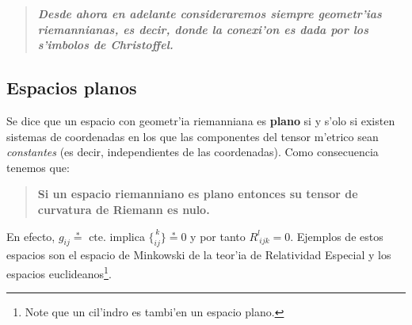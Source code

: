 
\begin{quotation}
\textbf{\textit{Desde ahora en adelante consideraremos siempre geometr'ias riemannianas, es
decir, donde la conexi'on es dada por los s'imbolos de Christoffel.}}
\end{quotation}

\subsection{Espacios planos}
Se dice que un espacio con geometr'ia riemanniana es \textbf{plano} si y s'olo si existen sistemas de coordenadas en los que las componentes del tensor m'etrico sean \textit{constantes} (es decir, independientes de las coordenadas). Como consecuencia tenemos que:
\begin{quotation}
\textbf{Si un espacio riemanniano es plano entonces su tensor de curvatura de Riemann es nulo.}
\end{quotation}
En efecto, $g_{ij}\overset{\ast}{=}$ cte. implica $\{ _{ i j}^{\, k}\}
\overset{\ast}{=}0$ y por tanto $R_{\ i j k}^l=0$. Ejemplos de estos
espacios son el espacio de Minkowski de la teor'ia de Relatividad Especial y
los espacios euclideanos\footnote{Note que un cil'indro es tambi'en un espacio plano.}.

